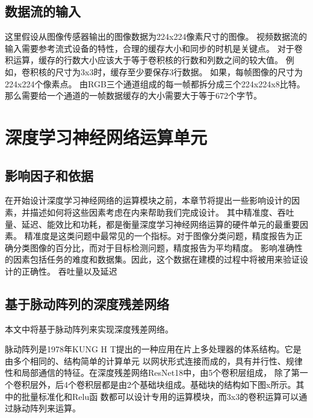 \subsection{数据流的输入}

这里假设从图像传感器输出的图像数据为224x224像素尺寸的图像。
视频数据流的输入需要参考流式设备的特性，合理的缓存大小和同步的时机是关键点。
对于卷积运算，缓存的行数大小应该大于等于卷积核的行数和列数之间的较大值。
例如，卷积核的尺寸为3x3时，缓存至少要保存3行数据。
如果，每帧图像的尺寸为224x224个像素点。
由RGB三个通道组成的每一帧都拆分成三个224x224x8比特。
那么需要给一个通道的一帧数据缓存的大小需要大于等于672个字节。


\section{深度学习神经网络运算单元}

\subsection{影响因子和依据}
在开始设计深度学习神经网络的运算模块之前，本章节将提出一些影响设计的因素，并描述如何将这些因素考虑在内来帮助我们完成设计。
其中精准度、吞吐量、延迟、能效比和功耗，都是衡量深度学习神经网络运算的硬件单元的最重要因素。
精准度是这类问题中最常见的一个指标。对于图像分类问题，精度报告为正确分类图像的百分比，而对于目标检测问题，精度报告为平均精度。
影响准确性的因素包括任务的难度和数据集。因此，这个数据在建模的过程中将被用来验证设计的正确性。
吞吐量以及延迟



\subsection{基于脉动阵列的深度残差网络}
本文中将基于脉动阵列来实现深度残差网络。




脉动阵列是1978年KUNG H T提出的一种应用在片上多处理器的体系结构。它是由多个相同的、结构简单的计算单元
以网状形式连接而成的，具有并行性、规律性和局部通信的特征。在深度残差网络ResNet18中，由5个卷积层组成，
除了第一个卷积层外，后4个卷积层都是由2个基础块组成。基础块的结构如下图x所示。其中的批量标准化和Relu函
数都可以设计专用的运算模块，而3x3的卷积运算可以通过脉动阵列来运算。


